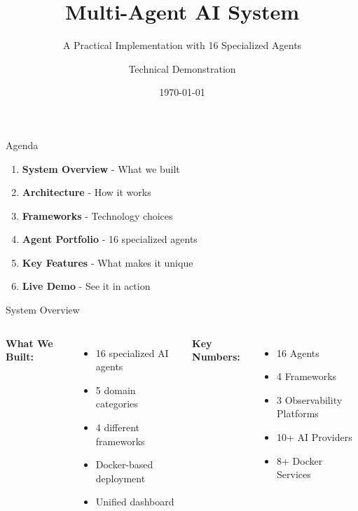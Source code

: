 \documentclass[aspectratio=169,11pt]{beamer}
\title{\textbf{Multi-Agent AI System}}
\subtitle{A Practical Implementation with 16 Specialized Agents}
\author{Technical Demonstration}
\date{\today}
\begin{document}
\begin{frame}
\titlepage
\end{frame}

\begin{frame}{Agenda}
\begin{enumerate}
    \item \textbf{System Overview} - What we built
    \item \textbf{Architecture} - How it works
    \item \textbf{Frameworks} - Technology choices
    \item \textbf{Agent Portfolio} - 16 specialized agents
    \item \textbf{Key Features} - What makes it unique
    \item \textbf{Live Demo} - See it in action
\end{enumerate}
\end{frame}

\begin{frame}{System Overview}
\begin{columns}
\textbf{What We Built:}
\begin{itemize}
    \item 16 specialized AI agents
    \item 5 domain categories
    \item 4 different frameworks
    \item Docker-based deployment
    \item Unified dashboard
\end{itemize}

\textbf{Key Numbers:}
\begin{itemize}
    \item {} 16 Agents
    \item {} 4 Frameworks
    \item {} 3 Observability Platforms
    \item {} 10+ AI Providers
    \item {} 8+ Docker Services
\end{itemize}
\end{columns}
\end{frame}
\end{document}
